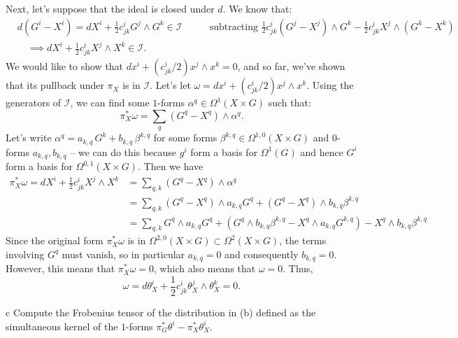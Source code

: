 \documentclass{../../templates/lkx_pset}
\begin{document}
\begin{parts}
	Next, let's suppose that the ideal is closed under $d$. We know that:
	\[
		\begin{aligned}
			 & d(G^i-X^i) = dX^i + \frac{1}{2}c^i_{j k} G^j\wedge G^k\in \mathcal{I}      & \quad\quad \textrm{subtracting }\frac{1}{2}c^i_{j k} (G^j - X^j)\wedge G^k - \frac{1}{2}c^i_{j k} X^j\wedge (G^k - X^k) \\
			 & \quad\implies dX^i + \frac{1}{2} c^i_{j k} X^j \wedge X^k \in \mathcal{I}.
		\end{aligned}
	\]
	We would like to show that $dx^i+(c^i_{j k} / 2) x^j\wedge x^k=0$, and so far, we've shown that its pullback under $\pi_X$ is in $\mathcal{I}$. Let's let $\omega = dx^i+(c^i_{j k} / 2) x^j\wedge x^k$. Using the generators of $\mathcal{I}$, we can find some $1$-forms $\alpha^q\in \Omega^{1}(X\times G)$ such that:
	\[
		\pi_X^*\omega = \sum_q(G^q - X^q)\wedge \alpha^q.
	\]
	Let's write $\alpha^q = a_{k,q}\,G^k + b_{k,q}\,\beta^{k,q}$ for some forms $\beta^{k,q}\in \Omega^{1,0}(X\times G)$ and $0$-forms $a_{k,q},b_{k,q}$ -- we can do this because $g^i$ form a basis for $\Omega^1(G)$ and hence $G^i$ form a basis for $\Omega^{0,1}(X\times G)$. Then we have
	\[
		\begin{aligned}
			\pi_X^*\omega = dX^i + \frac{1}{2}c^i_{j k} X^j\wedge X^k
			 & = \sum_{q,k} (G^q - X^q)\wedge \alpha^q                                                                                          \\
			 & = \sum_{q,k} (G^q - X^q)\wedge a_{k,q} G^q  + (G^q-X^q)\wedge b_{k,q} \beta^{k,q}                                                \\
			 & = \sum_{q,k} G^q\wedge a_{k,q} G^q + (G^q\wedge b_{k,q} \beta^{k,q} - X^q\wedge a_{k,q} G^{k,q}) - X^q\wedge b_{k,q} \beta^{k,q}
		\end{aligned}
	\]
	Since the original form $\pi^*_X\omega$ is in $\Omega^{2,0}(X\times G) \subset \Omega^2(X\times G)$, the terms involving $G^q$ must vanish, so in particular $a_{k,q}=0$ and consequently $b_{k,q}=0$. However, this means that $\pi_X^*\omega=0$, which also means that $\omega=0$. Thus,
	\[
		\omega = d\theta_X^i + \frac{1}{2}c^i_{j k} \theta^j_X \wedge \theta^k_X = 0.
	\]


	\begin{part}{c}
		Compute the Frobenius tensor of the distribution in (b) defined as the simultaneous kernel of the $1$-forms $\pi_G^*\theta^i - \pi_X^*\theta^i_X$.
	\end{part}


\end{parts}
\end{document}
